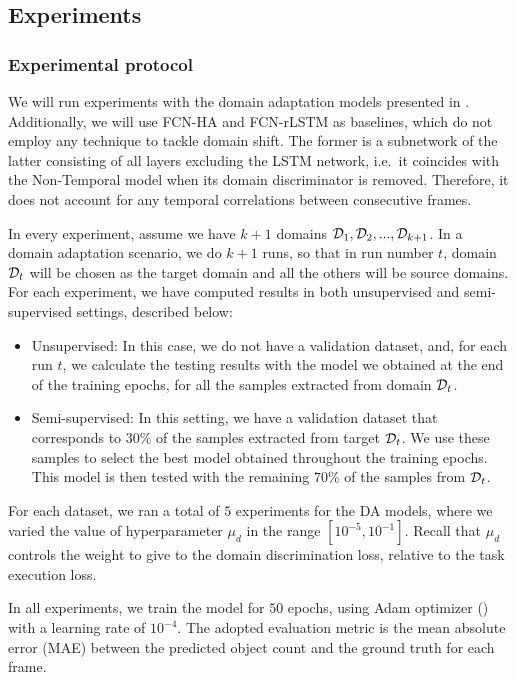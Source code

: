 \subsection{Experiments}

\subsubsection{Experimental protocol}

We will run experiments with the domain adaptation models presented in . Additionally, we will use FCN-HA and FCN-rLSTM as baselines, which do not employ any technique to tackle domain shift. The former is a subnetwork of the latter consisting of all layers excluding the LSTM network, i.e.\ it coincides with the Non-Temporal model when its domain discriminator is removed. Therefore, it does not account for any temporal correlations between consecutive frames.

In every experiment, assume we have $k+1$ domains ${\mathcal{D}}_1, {\mathcal{D}}_2,...,{\mathcal{D}}_{k+1}$. In a domain adaptation scenario, we do $k+1$ runs, so that in run number $t$, domain ${\mathcal{D}}_t$ will be chosen as the target domain and all the others will be source domains. For each experiment, we have computed results in both unsupervised and semi-supervised settings, described below:

\begin{itemize}
    \item Unsupervised: In this case, we do not have a validation dataset, and, for each run $t$, we calculate the testing results with the model we obtained at the end of the training epochs, for all the samples extracted from domain ${\mathcal{D}}_t$.
    \item Semi-supervised: In this setting, we have a validation dataset that corresponds to $30\%$ of the samples extracted from target ${\mathcal{D}}_t$. We use these samples to select the best model obtained throughout the training epochs. This model is then tested with the remaining $70\%$ of the samples from ${\mathcal{D}}_t$.
\end{itemize}

For each dataset, we ran a total of $5$ experiments for the DA models, where we varied the value of hyperparameter $\mu_d$ in the range $[10^{-5}, 10^{-1}]$. Recall that $\mu_d$ controls the weight to give to the domain discrimination loss, relative to the task execution loss.

In all experiments, we train the model for $50$ epochs, using Adam optimizer (\citet{Kingma2014}) with a learning rate of $10^{-4}$. The adopted evaluation metric is the mean absolute error (MAE) between the predicted object count and the ground truth for each frame.

